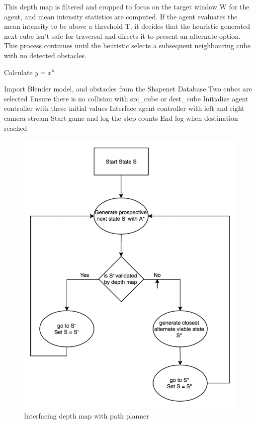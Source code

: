 This depth map is filtered and cropped to focus on the target window W for the agent, and mean intensity statistics are computed. If the agent evaluates the mean intensity to be above a threshold T, it decides that the heuristic generated next-cube isn't safe for traversal and directs it to present an alternate option. This process continues until the heuristic selects a subsequent neighbouring cube with no detected obstacles.

\begin{algorithm}
\caption{Calculate $y = x^n$}
\label{alg1}
\begin{algorithmic}[1]
\STATE Import Blender model, and obstacles from the Shapenet Database
\STATE Two cubes are selected
\STATE Ensure there is no collision with src\_cube or dest\_cube
\STATE Initialize agent controller with these initial values
\STATE Interface agent controller with left and right camera stream
\STATE Start game and log the step counts
\STATE End log when destination reached
\end{algorithmic}
\end{algorithm}

\begin{figure}
  \includegraphics[width=\linewidth]{images/flowchart.png}
  \caption{Interfacing depth map with path planner}
  \label{fig:flowchart1}
\end{figure}